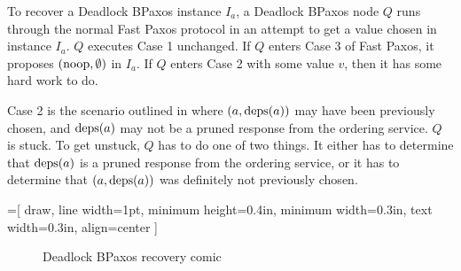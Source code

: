 To recover a Deadlock BPaxos instance $I_a$, a Deadlock BPaxos node $Q$ runs through
the normal Fast Paxos protocol in an attempt to get a value chosen in instance
$I_a$. $Q$ executes Case 1 unchanged. If $Q$ enters Case 3 of Fast Paxos, it
proposes $(\text{noop}, \emptyset)$ in $I_a$. If $Q$ enters Case 2 with some value
$v$, then it has some hard work to do.

Case 2 is the scenario outlined in  where $(a, \text{deps}(a))$
may have been previously chosen, and $\text{deps}(a)$ may not be a pruned response
from the ordering service. $Q$ is stuck. To get unstuck, $Q$ has to do one of
two things. It either has to determine that $\text{deps}(a)$ is a pruned response
from the ordering service, or it has to determine that $(a, \text{deps}(a))$ was
definitely not previously chosen.

=[%
  draw,
  line width=1pt,
  minimum height=0.4in,
  minimum width=0.3in,
  text width=0.3in,
  align=center
]
\begin{figure}[ht]
  \centering
  \caption{Deadlock BPaxos recovery comic}
\end{figure}

